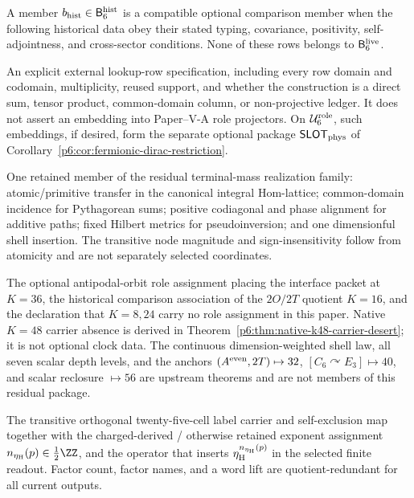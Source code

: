 \documentclass[12pt,a4paper]{article}
\newcommand{\BridgeLive}{\mathsf B_6^{\rm live}}
\newcommand{\BridgeRaw}{\mathsf B_6^{\rm hist}}
\newcommand{\CLKrem}{\mathsf{CLK}_{\rm rem}}
\newcommand{\Urole}{\mathcal U_6^{\rm role}}
\newcommand{\CMPexp}{\mathsf{CMP}_{\rm exp}}
\newcommand{\etaH}{\eta_{\rm H}}
\begin{document}
\begin{definition}
\label{p6:def:compatible-raw-bridge}
A member \(b_{\rm hist}\in\BridgeRaw\) is a compatible optional comparison
member when the following historical data obey their stated typing,
covariance, positivity, self-adjointness, and cross-sector conditions.  None
of these rows belongs to \(\BridgeLive\).
\begin{description}[style=nextline,leftmargin=2.8em]
\item[\(\mathsf{SLOT}\)]
An explicit external lookup-row specification, including every row domain
and codomain, multiplicity, reused support, and whether the construction is
a direct sum, tensor product, common-domain column, or non-projective ledger.
It does not assert an embedding into Paper--V-A role projectors.  On \(\Urole\),
such embeddings, if desired, form the separate optional package
\(\mathsf{SLOT}_{\rm phys}\) of
Corollary~\ref{p6:cor:fermionic-dirac-restriction}.

\item[\(\mathsf{TMF}\)]
One retained member of the residual terminal-mass realization family:
atomic/primitive transfer in the canonical integral Hom-lattice; common-domain
incidence for Pythagorean sums; positive codiagonal and phase alignment for
additive paths; fixed Hilbert metrics for pseudoinversion; and one dimensionful
shell insertion.  The transitive node magnitude and sign-insensitivity follow
from atomicity and are not separately selected coordinates.

\item[\(\CLKrem\)]
The optional antipodal-orbit role assignment placing the interface packet at
\(K=36\), the historical comparison association of the \(2O/2T\) quotient
\(K=16\), and the declaration that \(K=8,24\) carry no role assignment in
this paper.  Native \(K=48\) carrier absence is derived in
Theorem~\ref{p6:thm:native-k48-carrier-desert}; it is not optional clock data.
The continuous
dimension-weighted shell law, all seven scalar depth levels, and the anchors
\((A^{\rm even},2T)\mapsto32\),
\([C_6\curvearrowright E_3]\mapsto40\), and scalar reclosure \(\mapsto56\)
are upstream theorems and are not members of this residual package.

\item[\(\CMPexp\)]
The transitive orthogonal twenty-five-cell label carrier and self-exclusion
map together with the charged-derived / otherwise retained exponent assignment
\(n_{\etaH}(p)\in\tfrac12\ZZ\), and the operator that inserts
\(\etaH^{n_{\etaH}(p)}\) in the selected finite readout.  Factor count, factor
names, and a word lift are quotient-redundant for all current outputs.


\end{description}
\end{definition}
\end{document}
